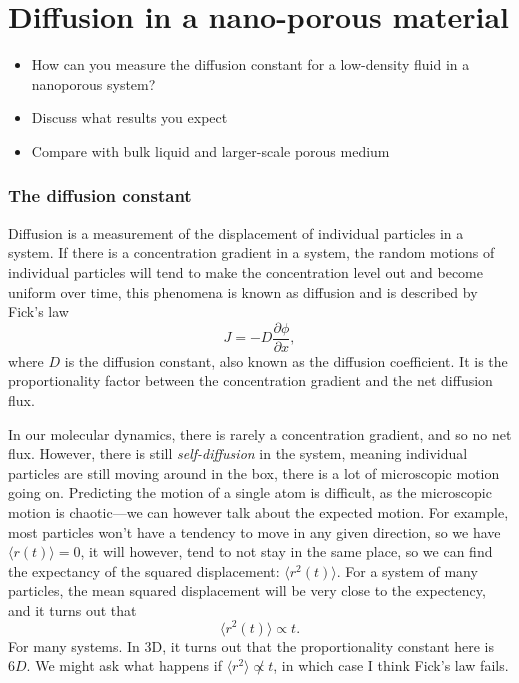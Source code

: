 \documentclass[a4paper, 11pt, notitlepage, english]{article}
\newcommand{\p}{\partial}
\begin{document}
\clearpage


\section{Diffusion in a nano-porous material}
\begin{itemize}
\item How can you measure the diffusion constant for a low-density fluid in a nanoporous system? 
\item Discuss what results you expect
\item Compare with bulk liquid and larger-scale porous medium
\end{itemize}

\subsubsection*{The diffusion constant}

Diffusion is a measurement of the displacement of individual particles in a system. If there is a concentration gradient in a system, the random motions of individual particles will tend to make the concentration level out and become uniform over time, this phenomena is known as diffusion and is described by Fick's law
$$J = -D\frac{\p \phi}{\p x},$$
where $D$ is the diffusion constant, also known as the diffusion coefficient. It is the proportionality factor between the concentration gradient and the net diffusion flux.

In our molecular dynamics, there is rarely a concentration gradient, and so no net flux. However, there is still \emph{self-diffusion} in the system, meaning individual particles are still moving around in the box, there is a lot of microscopic motion going on. Predicting the motion of a single atom is difficult, as the microscopic motion is chaotic---we can however talk about the expected motion. For example, most particles won't have a tendency to move in any given direction, so we have $\langle r(t) \rangle = 0$, it will however, tend to not stay in the same place, so we can find the expectancy of the squared displacement: $\langle r^2(t) \rangle$. For a system of many particles, the mean squared displacement will be very close to the expectency, and it turns out that
$$\langle r^2(t) \rangle \propto t.$$
For many systems. In 3D, it turns out that the proportionality constant here is $6D$. We might ask what happens if $\langle r^2 \rangle \not\propto t$, in which case I think Fick's law fails.
\end{document}
